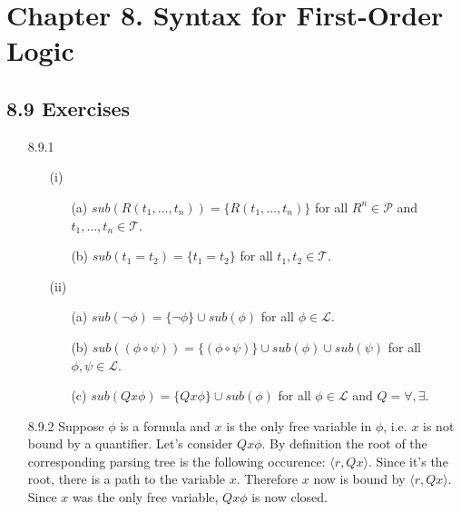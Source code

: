 
\chapter{Chapter 8. Syntax for First-Order Logic}

\section*{8.9 Exercises}

\begin{enumerate}

  \item[8.9.1]
    \begin{enumerate}
      \item[(i)] \begin{enumerate}
                   \item[(a)]
                     $sub(R(t_1, \dots, t_n)) = \{R(t_1, \dots, t_n)\}$ for all $R^n \in \mathcal{P}$ and \\ $t_1, \dots, t_n \in \mathcal{T}$.
                   \item[(b)]
                     $sub(t_1 = t_2) = \{t_1 = t_2\}$ for all $t_1, t_2 \in \mathcal{T}$.
                 \end{enumerate}
      \item[(ii)] \begin{enumerate}
                    \item[(a)]
                      $sub(\neg \phi) = \{\neg \phi\} \cup sub(\phi)$ for all $\phi \in \mathcal L$.
                    \item[(b)]
                      $sub((\phi \circ \psi)) = \{(\phi \circ \psi)\} \cup sub(\phi) \cup sub(\psi)$ for all $\phi, \psi \in \mathcal L$.
                    \item[(c)]
                      $sub(Qx \phi) = \{Qx\phi\} \cup sub(\phi)$ for all $\phi \in \mathcal L$ and $Q = \forall, \exists$.\\
                  \end{enumerate}
    \end{enumerate}

  \item[8.9.2]
    Suppose $\phi$ is a formula and $x$ is the only free variable in $\phi$, i.e. $x$ is not bound by a quantifier.
    Let's consider $Qx\phi$.
    By definition the root of the corresponding parsing tree is the following occurence: $\langle r, Qx \rangle$.
    Since it's the root, there is a path to the variable $x$.
    Therefore $x$ now is bound by $\langle r, Qx \rangle$.
    Since $x$ was the only free variable, $Qx\phi$ is now closed.\\


\end{enumerate}
